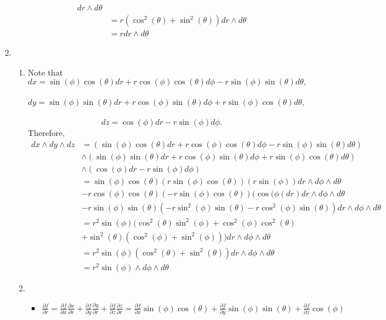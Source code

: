 \documentclass[12pt, letterpaper]{article}
\begin{document}
\begin{enumerate}
\begin{enumerate}
\begin{align*}
		 dr \wedge d\theta\\
		 &= r(\cos^2(\theta) + \sin^2(\theta))dr \wedge d\theta\\
		 &= r dr \wedge d\theta
		\end{align*}
	\end{enumerate}
	\item
	\begin{enumerate}
		\item Note that\\ $$dx = \sin (\phi) \cos(\theta)dr 
		+ r\cos(\phi)\cos(\theta) d\phi - r \sin(\phi) \sin(\theta)d \theta,$$ \\
		$$dy = \sin (\phi) \sin(\theta)dr 
		+ r\cos(\phi)\sin(\theta) d\phi + r \sin(\phi) \cos(\theta)d \theta,$$ \\
		$$dz = \cos(\phi)dr - r\sin(\phi)d\phi.$$  Therefore,
		\begin{align*}
		dx \wedge dy \wedge dz &= (\sin (\phi) \cos(\theta)dr 
		+ r\cos(\phi)\cos(\theta) d\phi - r \sin(\phi) \sin(\theta)d \theta)\\ &\wedge (\sin (\phi) \sin(\theta)dr
		+ r\cos(\phi)\sin(\theta) d\phi + r \sin(\phi) \cos(\theta)d \theta)\\ &\wedge(\cos(\phi)dr - r\sin(\phi)d\phi)\\
		&= \sin (\phi) \cos(\theta) (r \sin(\phi) \cos(\theta)) (r \sin (\phi)) dr \wedge d \phi \wedge d \theta\\
		&- r \cos(\phi)\cos(\theta)(-r\sin(\phi)\cos(\theta))
		(\cos(\phi(dr) dr \wedge d \phi \wedge d \theta\\
		&- r \sin(\phi)\sin(\theta)(-r \sin^2(\phi)\sin(\theta) - r \cos^2(\phi)\sin(\theta))dr \wedge d \phi \wedge d \theta\\
		&= r^2\sin(\phi)(\cos^2(\theta)\sin^2(\phi) + 
		\cos^2(\phi)\cos^2(\theta)\\ &+ \sin^2(\theta)(\cos^2(\phi) + \sin^2(\phi)))dr \wedge d \phi \wedge d \theta\\
		&= r^2 \sin(\phi)(\cos^2(\theta) + \sin^2(\theta))
		dr \wedge d \phi \wedge d \theta\\
		&= r^2 \sin(\phi)\wedge d \phi \wedge d \theta
		\end{align*}
		\item 
		\begin{itemize}
			\item $\frac{\partial f}{\partial r} 
			= \frac{\partial f}{\partial x} \frac{\partial x}{\partial r} + \frac{\partial f}{\partial y} \frac{\partial y}{\partial r} + \frac{\partial f}{\partial z} \frac{\partial z}{\partial r} = \frac{\partial f}{\partial x} \sin(\phi)\cos(\theta) + \frac{\partial f}{\partial y}  \sin(\phi)\sin(\theta) + \frac{\partial f}{\partial z} \cos(\phi)$

\end{itemize}
\end{enumerate}
\end{enumerate}
\end{document}
